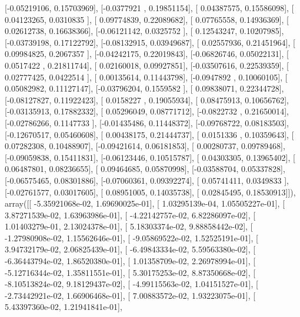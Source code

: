 \documentclass{article}
\begin{document}
       [-0.05219106,  0.15703969],
       [-0.0377921 ,  0.19851154],
       [ 0.04387575,  0.15586098],
       [ 0.04123265,  0.0310835 ],
       [ 0.09774839,  0.22089682],
       [ 0.07765558,  0.14936369],
       [ 0.02612738,  0.16638366],
       [-0.06121142,  0.0325752 ],
       [ 0.12543247,  0.10207985],
       [-0.03739198,  0.17122792],
       [-0.08132915,  0.03949687],
       [ 0.02557936,  0.21451964],
       [ 0.09984825,  0.2067357 ],
       [-0.04242175,  0.22019843],
       [-0.06826746,  0.05022131],
       [ 0.0517422 ,  0.21811744],
       [ 0.02160018,  0.09927851],
       [-0.03507616,  0.22539359],
       [ 0.02777425,  0.0422514 ],
       [ 0.00135614,  0.11443798],
       [-0.0947892 ,  0.10060105],
       [ 0.05082982,  0.11127147],
       [-0.03796204,  0.1559582 ],
       [ 0.09838071,  0.22344728],
       [-0.08127827,  0.11922423],
       [ 0.0158227 ,  0.19055934],
       [ 0.08475913,  0.10656762],
       [-0.03135913,  0.17882332],
       [ 0.05296049,  0.08771712],
       [-0.0822732 ,  0.21650014],
       [-0.02786266,  0.1147733 ],
       [-0.01435486,  0.11448372],
       [-0.09768722,  0.08183503],
       [-0.12670517,  0.05460608],
       [ 0.00438175,  0.21444737],
       [ 0.0151336 ,  0.10359643],
       [ 0.07282308,  0.10488907],
       [-0.09421614,  0.06181853],
       [ 0.00280737,  0.09789468],
       [-0.09059838,  0.15411831],
       [-0.06123446,  0.10515787],
       [ 0.04303305,  0.13965402],
       [ 0.06487801,  0.08236655],
       [ 0.09464685,  0.05870998],
       [-0.03588704,  0.05337828],
       [-0.06575465,  0.08301886],
       [-0.07060361,  0.09392274],
       [ 0.05741411,  0.0349833 ],
       [-0.02761577,  0.03017605],
       [ 0.08951005,  0.14035738],
       [ 0.02845495,  0.18530913]]), array([[ -5.35921068e-02,   1.69690025e-01],
       [  1.03295139e-04,   1.05505227e-01],
       [  3.87271539e-02,   1.63963986e-01],
       [ -4.22142757e-02,   6.82286097e-02],
       [  1.01403279e-01,   2.13024378e-01],
       [  5.18303374e-02,   9.88858442e-02],
       [ -1.27980908e-02,   1.15562646e-01],
       [ -9.05869522e-02,   1.52525191e-01],
       [  3.94732179e-02,   2.06825439e-01],
       [ -6.49843334e-02,   5.59563380e-02],
       [ -6.36443794e-02,   1.86520380e-01],
       [  1.01358709e-02,   2.26978994e-01],
       [ -5.12716344e-02,   1.35811551e-01],
       [  5.30175253e-02,   8.87350668e-02],
       [ -8.10513824e-02,   9.18129437e-02],
       [ -4.99115563e-02,   1.04151527e-01],
       [ -2.73442921e-02,   1.66906468e-01],
       [  7.00883572e-02,   1.93223075e-01],
       [  5.43397360e-02,   1.21941841e-01],
\end{document}
